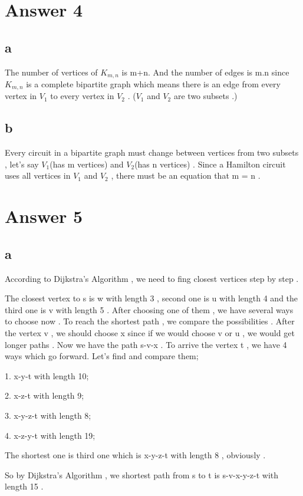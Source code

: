 \documentclass[11pt]{article}
\begin{document}
\section*{Answer 4}
\subsection*{a}
\hspace{12px} The number of vertices of \textit{$K_{m,n}$} is m+n. And the number of edges is m.n since \textit{$K_{m,n}$} is a complete bipartite graph which means there is an edge from every vertex in \textit{$V_1$} to every vertex in \textit{$V_2$} . (\textit{$V_1$} and \textit{$V_2$} are two subsets .)
\subsection*{b}
\hspace{12px} Every circuit in a bipartite graph must change between vertices from two subsets , let's say \textit{$V_1$}(has m vertices) and \textit{$V_2$}(has n vertices) . Since a Hamilton circuit uses all vertices in \textit{$V_1$} and \textit{$V_2$} , there must be an equation that m = n . 

\section*{Answer 5}
\subsection*{a}
\hspace{15px} According to Dijkstra's Algorithm , we need to fing closest vertices step by step . \par 
The closest vertex to s is w with length 3 , second one is u with length 4 and the third one is v with length 5 . After choosing one of them , we have several ways to choose now . To reach the shortest path , we compare the possibilities . After the vertex v , we should choose x since if we would choose v or u , we would get longer paths . Now we have the path s-v-x . To arrive the vertex t , we have 4 ways which go forward. Let's find and compare them; \par 
1.  x-y-t with length 10; \par 
2.  x-z-t with length 9; \par
3.  x-y-z-t with length 8; \par
4.  x-z-y-t with length 19; \par 
The shortest one is third one which is x-y-z-t with length 8 , obviously . \par 
So by Dijkstra's Algorithm , we shortest path from s to t is s-v-x-y-z-t with length 15 .
\end{document}
